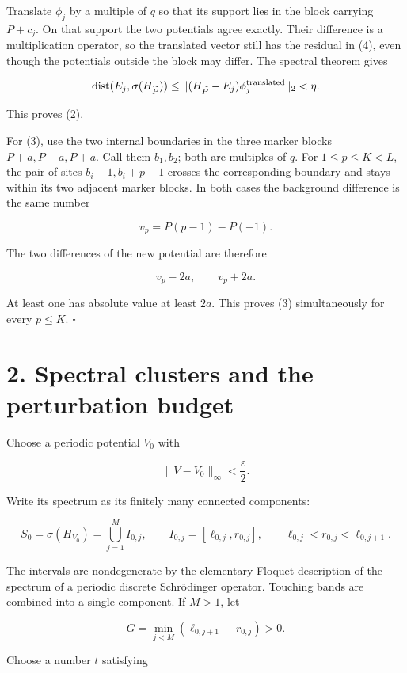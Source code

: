 \documentclass[11pt,a4paper]{article}
\begin{document}
Translate \(\phi_j\) by a multiple of \(q\) so that its support lies in
the block carrying \(P+c_j\). On that support the two potentials agree
exactly. Their difference is a multiplication operator, so the
translated vector still has the residual in (4), even though the
potentials outside the block may differ. The spectral theorem gives

\[
\operatorname{dist}(E_j,\sigma(H_{\widetilde P}))
\leq\|(H_{\widetilde P}-E_j)\phi_j^{\rm translated}\|_2<\eta.
\]

This proves (2).

For (3), use the two internal boundaries in the three marker blocks
\(P+a,P-a,P+a\). Call them \(b_1,b_2\); both are multiples of \(q\). For
\(1\leq p\leq K<L\), the pair of sites \(b_i-1,b_i+p-1\) crosses the
corresponding boundary and stays within its two adjacent marker blocks.
In both cases the background difference is the same number

\[
v_p=P(p-1)-P(-1).
\]

The two differences of the new potential are therefore

\[
v_p-2a,\qquad v_p+2a.
\]

At least one has absolute value at least \(2a\). This proves (3)
simultaneously for every \(p\leq K\). \(\square\)

\hypertarget{1031-spectral-clusters-and-the-perturbation-budget}{%
\section{2. Spectral clusters and the perturbation
budget}\label{1031-spectral-clusters-and-the-perturbation-budget}}

Choose a periodic potential \(V_0\) with

\[
\|V-V_0\|_\infty<\frac{\varepsilon}{2}.
\]

Write its spectrum as its finitely many connected components:

\[
S_0=\sigma(H_{V_0})
=\bigcup_{j=1}^{M}I_{0,j},
\qquad
I_{0,j}=[\ell_{0,j},r_{0,j}],
\qquad
\ell_{0,j}<r_{0,j}<\ell_{0,j+1}.
\tag{6}
\]

The intervals are nondegenerate by the elementary Floquet description of
the spectrum of a periodic discrete Schrödinger operator. Touching bands
are combined into a single component. If \(M>1\), let

\[
G=\min_{j<M}(\ell_{0,j+1}-r_{0,j})>0.
\]

Choose a number \(t\) satisfying
\end{document}
